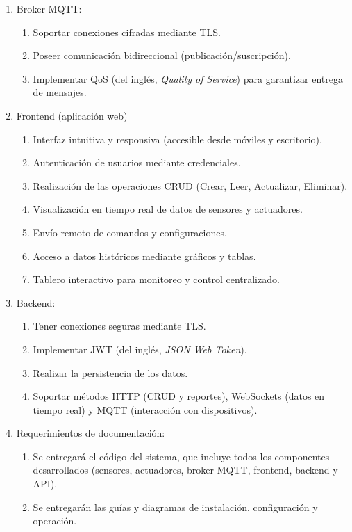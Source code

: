 \begin{enumerate}
      \item Broker MQTT:
            \begin{enumerate}
                  \item Soportar conexiones cifradas mediante TLS.
                  \item Poseer comunicación bidireccional (publicación/suscripción).
                  \item Implementar QoS (del inglés, \textit{Quality of Service}) para garantizar entrega de
                        mensajes.
            \end{enumerate}

      \item Frontend (aplicación web)
            \begin{enumerate}
                  \item Interfaz intuitiva y responsiva (accesible desde móviles y escritorio).
                  \item Autenticación de usuarios mediante credenciales.
                  \item Realización de las operaciones CRUD (Crear, Leer, Actualizar, Eliminar).
                  \item Visualización en tiempo real de datos de sensores y actuadores.
                  \item Envío remoto de comandos y configuraciones.
                  \item Acceso a datos históricos mediante gráficos y tablas.
                  \item Tablero interactivo para monitoreo y control centralizado.
            \end{enumerate}

      \item Backend:
            \begin{enumerate}
                  \item Tener conexiones seguras mediante TLS.
                  \item Implementar JWT (del inglés, \textit{JSON Web Token}).
                  \item Realizar la persistencia de los datos.
                  \item Soportar métodos HTTP (CRUD y reportes), WebSockets (datos en tiempo real)
                        y MQTT (interacción con dispositivos).
            \end{enumerate}

      \item Requerimientos de documentación:
            \begin{enumerate}
                  \item Se entregará el código del sistema, que incluye todos los componentes
                        desarrollados (sensores, actuadores, broker MQTT, frontend, backend y API).
                  \item Se entregarán las guías y diagramas de instalación, configuración y operación.
            \end{enumerate}
\end{enumerate}

